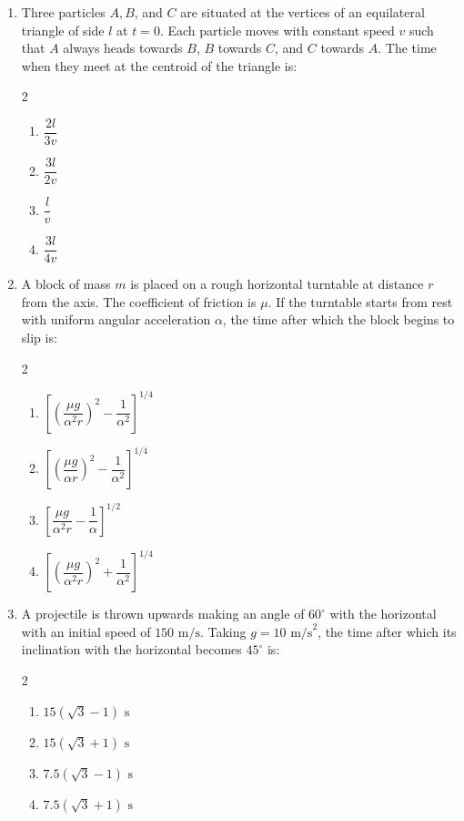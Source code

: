 \documentclass[11pt,a4paper]{article}
\begin{document}
\begin{enumerate}[label=\textbf{\textcolor{l3Crimson}{Q\arabic*.}},leftmargin=24pt,itemsep=10pt,start=51]
  \item Three particles $A, B$, and $C$ are situated at the vertices of an equilateral triangle of side $l$ at $t = 0$. Each particle moves with constant speed $v$ such that $A$ always heads towards $B$, $B$ towards $C$, and $C$ towards $A$. The time when they meet at the centroid of the triangle is:
  \begin{multicols}{2}
  \begin{enumerate}[label=\textbf{\textcolor{primaryDark}{(\Alph*)}},itemsep=2pt]
    \item $\dfrac{2l}{3v}$
    \item $\dfrac{3l}{2v}$
    \item $\dfrac{l}{v}$
    \item $\dfrac{3l}{4v}$
  \end{enumerate}
  \end{multicols}

  \item A block of mass $m$ is placed on a rough horizontal turntable at distance $r$ from the axis. The coefficient of friction is $\mu$. If the turntable starts from rest with uniform angular acceleration $\alpha$, the time after which the block begins to slip is:
  \begin{multicols}{2}
  \begin{enumerate}[label=\textbf{\textcolor{primaryDark}{(\Alph*)}},itemsep=2pt]
    \item $\left[\left(\dfrac{\mu g}{\alpha^2 r}\right)^2 - \dfrac{1}{\alpha^2}\right]^{1/4}$
    \item $\left[\left(\dfrac{\mu g}{\alpha r}\right)^2 - \dfrac{1}{\alpha^2}\right]^{1/4}$
    \item $\left[\dfrac{\mu g}{\alpha^2 r} - \dfrac{1}{\alpha}\right]^{1/2}$
    \item $\left[\left(\dfrac{\mu g}{\alpha^2 r}\right)^2 + \dfrac{1}{\alpha^2}\right]^{1/4}$
  \end{enumerate}
  \end{multicols}

  \item A projectile is thrown upwards making an angle of $60^\circ$ with the horizontal with an initial speed of $150\text{ m/s}$. Taking $g = 10\text{ m/s}^2$, the time after which its inclination with the horizontal becomes $45^\circ$ is:
  \begin{multicols}{2}
  \begin{enumerate}[label=\textbf{\textcolor{primaryDark}{(\Alph*)}},itemsep=2pt]
    \item $15(\sqrt{3} - 1)\text{ s}$
    \item $15(\sqrt{3} + 1)\text{ s}$
    \item $7.5(\sqrt{3} - 1)\text{ s}$
    \item $7.5(\sqrt{3} + 1)\text{ s}$
  \end{enumerate}
  \end{multicols}


\end{enumerate}
\end{document}
